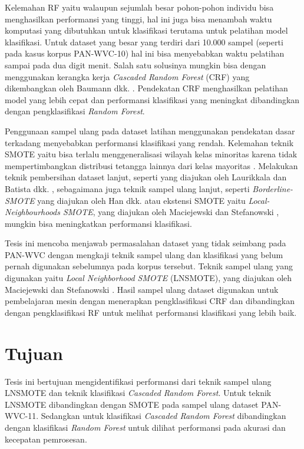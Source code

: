 Kelemahan RF yaitu walaupun sejumlah besar pohon-pohon individu
bisa menghasilkan performansi yang tinggi, hal ini juga bisa menambah waktu
komputasi yang dibutuhkan untuk klasifikasi terutama untuk pelatihan model
klasifikasi.
Untuk dataset yang besar yang terdiri dari 10.000 sampel (seperti pada kasus
korpus PAN-WVC-10) hal ini bisa menyebabkan waktu pelatihan sampai pada dua
digit menit.
Salah satu solusinya mungkin bisa dengan menggunakan kerangka kerja
\textit{Cascaded Random Forest} (CRF)
yang dikembangkan oleh Baumann dkk.
\cite{baumann2013cascaded}.
Pendekatan CRF menghasilkan pelatihan model yang lebih cepat dan performansi
klasifikasi yang meningkat dibandingkan dengan pengklasifikasi \textit{Random
Forest}.

Penggunaan sampel ulang pada dataset latihan menggunakan pendekatan dasar
terkadang menyebabkan performansi klasifikasi yang rendah.
Kelemahan teknik SMOTE yaitu bisa terlalu menggeneralisasi wilayah kelas
minoritas karena tidak mempertimbangkan distribusi tetangga lainnya dari
kelas mayoritas
\cite{maciejewski2011local}.
Melakukan teknik pembersihan dataset lanjut, seperti yang diajukan oleh
Laurikkala
\cite{laurikkala2001improving}
dan Batista dkk.
\cite{batista2004study},
sebagaimana juga teknik sampel ulang lanjut, seperti
\textit{Borderline-SMOTE}
yang diajukan oleh Han dkk.
\cite{han2005borderline}
atau ekstensi SMOTE yaitu \textit{Local-Neighbourhoods SMOTE}, yang diajukan
oleh Maciejewski dan Stefanowski
\cite{maciejewski2011local},
mungkin bisa meningkatkan performansi klasifikasi.

Tesis ini mencoba menjawab permasalahan dataset yang tidak seimbang pada
PAN-WVC dengan mengkaji teknik sampel ulang dan klasifikasi yang belum pernah
digunakan sebelumnya pada korpus tersebut.
Teknik sampel ulang yang digunakan yaitu
\textit{Local Neighborhood SMOTE} (LNSMOTE),
yang diajukan oleh Maciejewski dan
Stefanowski
\cite{maciejewski2011local}.
Hasil sampel ulang dataset digunakan untuk pembelajaran mesin dengan menerapkan
pengklasifikasi CRF dan dibandingkan dengan pengklasifikasi RF untuk melihat
performansi klasifikasi yang lebih baik.


\section{Tujuan}
\label{sec:tujuan}

Tesis ini bertujuan mengidentifikasi performansi dari teknik sampel ulang
LNSMOTE dan teknik klasifikasi
\textit{Cascaded Random Forest}.
Untuk teknik LNSMOTE dibandingkan dengan SMOTE pada sampel ulang dataset
PAN-WVC-11.
Sedangkan untuk klasifikasi
\textit{Cascaded Random Forest}
dibandingkan dengan klasifikasi
\textit{Random Forest}
untuk dilihat performansi pada akurasi dan kecepatan pemrosesan.

